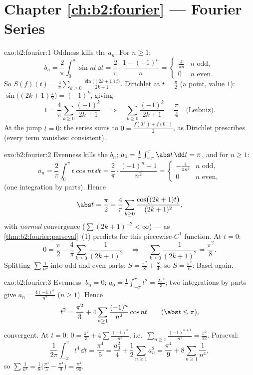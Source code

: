 \section*{Chapter \ref{ch:b2:fourier} --- Fourier Series}

\begin{solution}{exo:b2:fourier:1}
Oddness kills the $a_n$. For $n \geq 1$:
\[
b_n = \frac{2}{\pi}\int_0^{\pi} \sin nt\,\dd t
= \frac{2}{\pi}\cdot\frac{1 - (-1)^n}{n}
= \begin{cases} \frac{4}{\pi n} & n \text{ odd},\\ 0 & n
\text{ even}. \end{cases}
\]
So $S(f)(t) = \frac{4}{\pi}\sum_{k\geq0} \frac{\sin\bigl((2k+1)t
\bigr)}{2k+1}$. Dirichlet at $t = \frac\pi2$ (a  point,
value $1$): $\sin\bigl((2k+1)\frac\pi2\bigr) = (-1)^k$, giving
\[
1 = \frac4\pi \sum_{k\geq0}\frac{(-1)^k}{2k+1}
\quad\Longrightarrow\quad
\sum_{k\geq0}\frac{(-1)^k}{2k+1} = \frac{\pi}{4}
\quad\text{(Leibniz)}.
\]
At the jump $t = 0$: the series sums to $0 = \frac{f(0^+) +
f(0^-)}{2}$, as Dirichlet prescribes (every term vanishes:
consistent).
\end{solution}

\begin{solution}{exo:b2:fourier:2}
Evenness kills the $b_n$; $a_0 = \frac{1}{\pi}\int_{-\pi}^\pi\abs
t\,\dd t = \pi$, and for $n \geq 1$:
\[
a_n = \frac{2}{\pi}\int_0^\pi t\cos nt\,\dd t
= \frac{2}{\pi}\cdot\frac{(-1)^n - 1}{n^2}
= \begin{cases} -\frac{4}{\pi n^2} & n \text{ odd},\\ 0 & n
\text{ even}, \end{cases}
\]
(one integration by parts). Hence
\[
\abs t = \frac{\pi}{2} - \frac{4}{\pi}\sum_{k\geq0}
\frac{\cos\bigl((2k+1)t\bigr)}{(2k+1)^2} ,
\]
with \emph{normal} convergence ($\sum (2k+1)^{-2} < \infty$) --- as
\cref{thm:b2:fourier:parseval}~(1) predicts for this 
piecewise-$C^1$ function. At $t = 0$:
\[
0 = \frac\pi2 - \frac4\pi\sum_{k\geq0}\frac{1}{(2k+1)^2}
\quad\Longrightarrow\quad
\sum_{k\geq0}\frac{1}{(2k+1)^2} = \frac{\pi^2}{8} .
\]
Splitting $\sum \frac{1}{n^2}$ into odd and even parts: $S =
\frac{\pi^2}{8} + \frac S4$, so $S = \frac{\pi^2}{6}$: Basel again.
\end{solution}

\begin{solution}{exo:b2:fourier:3}
Evenness: $b_n = 0$; $a_0 = \frac{1}{\pi}\int_{-\pi}^{\pi} t^2 =
\frac{2\pi^2}{3}$; two integrations by parts give $a_n =
\frac{4(-1)^n}{n^2}$ ($n \geq 1$). Hence
\[
t^2 = \frac{\pi^2}{3} + 4\sum_{n\geq1}
\frac{(-1)^n}{n^2}\cos nt
\qquad (\abs t \leq \pi),
\]
 convergent. At $t = 0$: $0 = \frac{\pi^2}{3} +
4\sum\frac{(-1)^n}{n^2}$, i.e.\ $\sum_{n\geq1}
\frac{(-1)^{n+1}}{n^2} = \frac{\pi^2}{12}$. Parseval:
\[
\frac{1}{2\pi}\int_{-\pi}^{\pi} t^4\,\dd t = \frac{\pi^4}{5}
= \frac{a_0^2}{4} + \frac12\sum_{n\geq1} a_n^2
= \frac{\pi^4}{9} + 8\sum_{n\geq1}\frac{1}{n^4} ,
\]
so $\sum \frac{1}{n^4} = \frac18\bigl(\frac{\pi^4}{5} -
\frac{\pi^4}{9}\bigr) = \frac{\pi^4}{90}$.
\end{solution}

